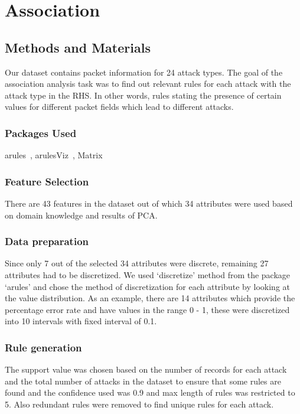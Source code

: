 \documentclass[11pt]{article}
\begin{document}
\section{Association}
\label{Sec:Assoc}

\subsection{Methods and Materials}
Our dataset contains packet information for 24 attack types. The goal of the association analysis task was to find out relevant rules for each attack with the attack type in the RHS. In other words, rules stating the presence of certain values for different packet fields which lead to different attacks.

\subsubsection{Packages Used}
arules~\cite{arules}, arulesViz~\cite{arulesViz}, Matrix~\cite{matrix}

\subsubsection{Feature Selection}
There are 43 features in the dataset out of which 34 attributes were used based on domain knowledge and results of PCA. 

\subsubsection{Data preparation}
Since only 7 out of the selected 34 attributes were discrete, remaining 27 attributes had to be discretized. We used `discretize' method from the package `arules' and chose the method of discretization for each attribute by looking at the value distribution. As an example, there are 14 attributes which provide the percentage error rate and have values in the range 0 - 1, these were discretized into 10 intervals with fixed interval of 0.1.

\subsubsection{Rule generation}
The support value was chosen based on the number of records for each attack and the total number of attacks in the dataset to ensure that some rules are found and the confidence used was 0.9 and max length of rules was restricted to 5. Also redundant rules were removed to find unique rules for each attack.
\end{document}
